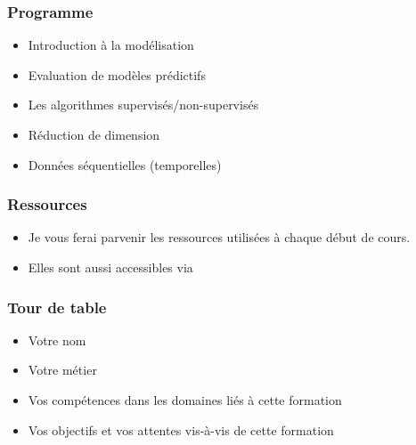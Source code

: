 \begin{frame}
  \frametitle{Programme}
  \begin{itemize}
  \item Introduction à la modélisation
  \item Evaluation de modèles prédictifs
  \item Les algorithmes supervisés/non-supervisés
  \item Réduction de dimension
  \item Données séquentielles (temporelles)
  \end{itemize}
\end{frame}

\begin{frame}
  \frametitle{Ressources}
  \begin{itemize}
  \item Je vous ferai parvenir les ressources utilisées à chaque début de cours.
  \item Elles sont aussi accessibles via 
  \end{itemize}
\end{frame}

\begin{frame}
  \frametitle{Tour de table}
  \begin{itemize}
  \item Votre nom
  \item Votre métier
  \item Vos compétences dans les domaines liés à cette formation
  \item Vos objectifs et vos attentes vis-à-vis de cette formation
  \end{itemize}
\end{frame}
